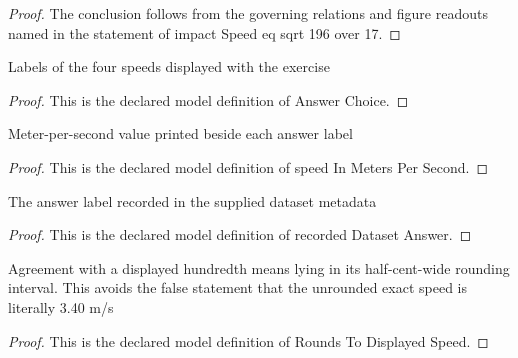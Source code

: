 \begin{proof}
  The conclusion follows from the governing relations and figure readouts named in the statement of impact Speed eq sqrt 196 over 17.
\end{proof}
\begin{definition}
  \label{def:physics:phyx-mini-0775:phyxminiproblems-problemphyxmini0775-answerchoice}
  Labels of the four speeds displayed with the exercise
\end{definition}
\begin{proof}
  This is the declared model definition of Answer Choice.
\end{proof}
\begin{definition}
  \label{def:physics:phyx-mini-0775:phyxminiproblems-problemphyxmini0775-answerchoice-speedinmeterspersecond}
  Meter-per-second value printed beside each answer label
\end{definition}
\begin{proof}
  This is the declared model definition of speed In Meters Per Second.
\end{proof}
\begin{definition}
  \label{def:physics:phyx-mini-0775:phyxminiproblems-problemphyxmini0775-recordeddatasetanswer}
  The answer label recorded in the supplied dataset metadata
\end{definition}
\begin{proof}
  This is the declared model definition of recorded Dataset Answer.
\end{proof}
\begin{definition}
  \label{def:physics:phyx-mini-0775:phyxminiproblems-problemphyxmini0775-roundstodisplayedspeed}
  Agreement with a displayed hundredth means lying in its half-cent-wide rounding interval. This avoids the false statement that the unrounded exact speed is literally 3.40 m/s
\end{definition}
\begin{proof}
  This is the declared model definition of Rounds To Displayed Speed.
\end{proof}
